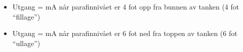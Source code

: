 \begin{itemize}
\item{} Utgang =  mA når parafinnivået er 4 fot opp fra bunnen av tanken (4 fot ``fillage'')
\item{} Utgang =  mA når parafinnivået er 6 fot ned fra toppen av tanken (6 fot ``ullage'')
\end{itemize}










